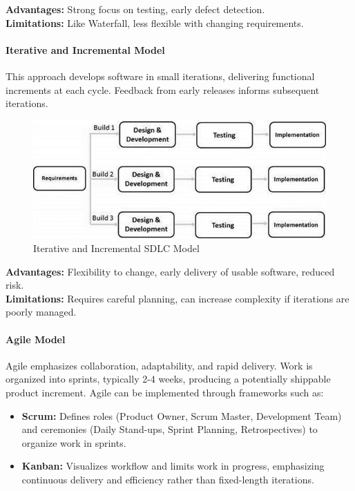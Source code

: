 \begin{spacing}{1.2}
\textbf{Advantages:} Strong focus on testing, early defect detection.\\ 
\textbf{Limitations:} Like Waterfall, less flexible with changing requirements.  

\paragraph{Iterative and Incremental Model}
This approach develops software in small iterations, delivering functional increments at each cycle. Feedback from early releases informs subsequent iterations.  

\begin{figure}[H]
    \centering
    \includegraphics[scale=0.6]{Images/sdlc_iterative_model.jpg}
    \caption{Iterative and Incremental SDLC Model}
    \label{fig:iterative_model}
\end{figure}

\textbf{Advantages:} Flexibility to change, early delivery of usable software, reduced risk.\\  
\textbf{Limitations:} Requires careful planning, can increase complexity if iterations are poorly managed.  

\paragraph{Agile Model}
Agile emphasizes collaboration, adaptability, and rapid delivery. Work is organized into sprints, typically 2-4 weeks, producing a potentially shippable product increment. 
Agile can be implemented through frameworks such as:

\begin{itemize}
    \item \textbf{Scrum:} Defines roles (Product Owner, Scrum Master, Development Team) and ceremonies (Daily Stand-ups, Sprint Planning, Retrospectives) to organize work in sprints.
    \item \textbf{Kanban:} Visualizes workflow and limits work in progress, emphasizing continuous delivery and efficiency rather than fixed-length iterations.
\end{itemize}


\end{spacing}
